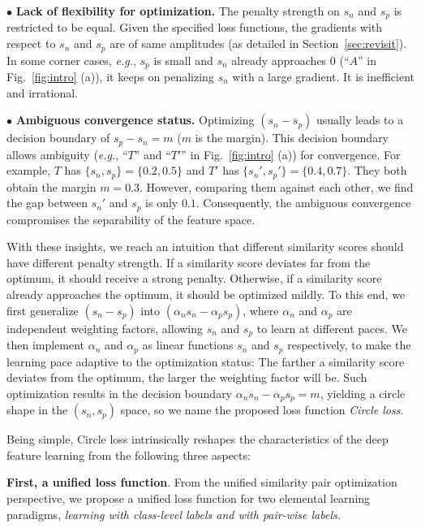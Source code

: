 \documentclass[10pt,twocolumn,letterpaper]{article}
\begin{document}
$\bullet$ \textbf{Lack of flexibility for optimization.}  The penalty strength on $s_n$ and $s_p$ is restricted to be equal. Given the specified loss functions, the gradients with respect to $s_n$ and $s_p$ are of same amplitudes (as detailed in Section~\ref{sec:revisit}). In some corner cases, \emph{e.g.}, $s_p$ is small and $s_n$ already approaches 0 (``$A$'' in Fig.~\ref{fig:intro} (a)), it keeps on penalizing $s_n$ with a large gradient. It is inefficient and irrational. %

$\bullet$ \textbf{Ambiguous convergence status.}
Optimizing $(s_n-s_p)$ usually leads to a decision boundary of $s_p-s_n=m$ ($m$ is the margin). This decision boundary allows ambiguity (\emph{e.g.}, ``$T$'' and ``$T'$'' in Fig.~\ref{fig:intro} (a)) for convergence. For example, $T$ has $\{s_n,s_p\}=\{0.2,0.5\}$ and $T'$ has $\{s_n',s_p'\}=\{0.4,0.7\}$. They both obtain the margin $m=0.3$. However, comparing them against each other, we find the gap between $s_n'$ and $s_p$ is only $0.1$. Consequently, the ambiguous convergence compromises the separability of the feature space. 


With these insights, we reach an intuition that different similarity scores should have different penalty strength. If a similarity score deviates far from the optimum, it should receive a strong penalty. Otherwise, if a similarity score already approaches the optimum, it should be optimized mildly. To this end, we first generalize $(s_n-s_p)$ into $(\alpha_n s_n - \alpha_p s_p)$, where $\alpha_n$ and $\alpha_p$ are independent weighting factors, allowing $s_n$ and $s_p$ to learn at different paces. 
We then implement $\alpha_n$ and $\alpha_p$ as linear functions \wrt $s_n$ and $s_p$ respectively, to make the learning pace adaptive to the optimization status: The farther a similarity score deviates from the optimum, the larger the weighting factor will be. Such optimization results in the decision boundary $\alpha_n s_n - \alpha_p s_p = m$, yielding a circle shape in the $(s_n,s_p)$ space, so we name the proposed loss function \emph{Circle loss}.

Being simple, Circle loss intrinsically reshapes the characteristics of the deep feature learning from the following three aspects:

\textbf{First, a unified loss function}. From the unified similarity pair optimization perspective, we propose a unified loss function for two elemental learning paradigms, \emph{learning with class-level labels and with pair-wise labels.}
\end{document}
